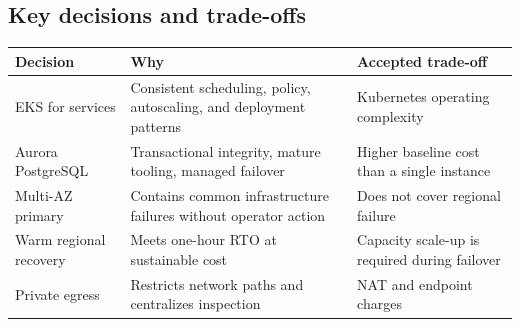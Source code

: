 \subsection{Key decisions and trade-offs}

\begin{tabularx}{\textwidth}{@{}L{31mm}Y Y@{}}
  \toprule
  \color{white}\textbf{Decision} & \color{white}\textbf{Why} & \color{white}\textbf{Accepted trade-off} \\
  \midrule
  EKS for services & Consistent scheduling, policy, autoscaling, and deployment patterns & Kubernetes operating complexity \\
  Aurora PostgreSQL & Transactional integrity, mature tooling, managed failover & Higher baseline cost than a single instance \\
  Multi-AZ primary & Contains common infrastructure failures without operator action & Does not cover regional failure \\
  Warm regional recovery & Meets one-hour RTO at sustainable cost & Capacity scale-up is required during failover \\
  Private egress & Restricts network paths and centralizes inspection & NAT and endpoint charges \\
  \bottomrule
\end{tabularx}

